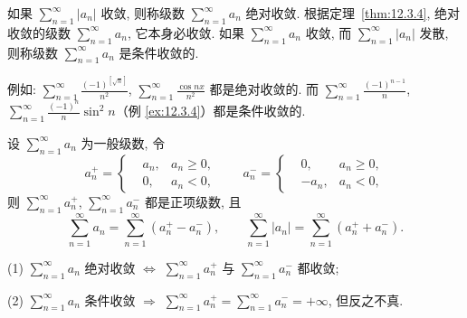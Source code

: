 \begin{definition}\label{def:12.3.1}
如果 $\sum_{n=1}^{\infty}|a_{n}|$ 收敛, 则称级数 $\sum_{n=1}^{\infty}a_{n}$ 绝对收敛. 根据定理~\ref{thm:12.3.4}, 绝对收敛的级数 $\sum_{n=1}^{\infty}a_{n}$, 它本身必收敛. 如果 $\sum_{n=1}^{\infty}a_{n}$ 收敛, 而 $\sum_{n=1}^{\infty}|a_{n}|$ 发散, 则称级数 $\sum_{n=1}^{\infty}a_{n}$ 是条件收敛的.

例如: $\sum_{n=1}^{\infty}\frac{(-1)^{[\sqrt{n}]}}{n^{2}}$, $\sum_{n=1}^{\infty}\frac{\cos nx}{n^{2}}$ 都是绝对收敛的. 而 $\sum_{n=1}^{\infty}\frac{(-1)^{n-1}}{n}$, $\sum_{n=1}^{\infty}\frac{(-1)^{n}}{n}\sin^{2}n$（例 \ref{ex:12.3.4}）都是条件收敛的.
\end{definition}

\begin{definition}\label{def:12.3.2}
设 $\sum_{n=1}^{\infty}a_{n}$ 为一般级数, 令
\[
  a_{n}^{+}=\left\{\begin{aligned}
    &a_{n}, & a_{n}\geqslant0,\\
    &0, & a_{n}<0,
  \end{aligned}\right.
  \qquad
  a_{n}^{-}=\left\{\begin{aligned}
    &0, & a_{n}\geqslant0,\\
    &-a_{n}, & a_{n}<0,
  \end{aligned}\right.
\]
则 $\sum_{n=1}^{\infty}a_{n}^{+}$, $\sum_{n=1}^{\infty}a_{n}^{-}$ 都是正项级数, 且
\[
  \sum_{n=1}^{\infty}a_{n}=\sum_{n=1}^{\infty}(a_{n}^{+}-a_{n}^{-}),
  \qquad
  \sum_{n=1}^{\infty}|a_{n}|=\sum_{n=1}^{\infty}(a_{n}^{+}+a_{n}^{-}).
\]
\end{definition}

\begin{theorem}\label{thm:12.3.5}
(1) $\sum_{n=1}^{\infty}a_{n}$ 绝对收敛 $\Leftrightarrow$ $\sum_{n=1}^{\infty}a_{n}^{+}$ 与 $\sum_{n=1}^{\infty}a_{n}^{-}$ 都收敛;

(2) $\sum_{n=1}^{\infty}a_{n}$ 条件收敛 $\Rightarrow$ $\sum_{n=1}^{\infty}a_{n}^{+}=\sum_{n=1}^{\infty}a_{n}^{-}=+\infty$, 但反之不真.
\end{theorem}


